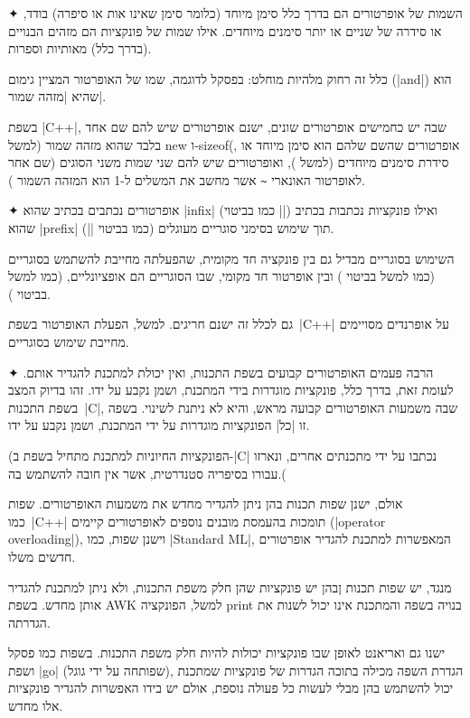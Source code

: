 \begin{enumerate}
 ✦ השמות של אופרטורים הם בדרך כלל סימן מיוחד (כלומר סימן שאינו אות או סיפרה)
 בודד, או סידרה של שניים או יותר סימנים מיוחדים. אילו שמות של פונקציות הם
 מזהים הבנויים (בדרך כלל) מאותיות וספרות.

 כלל זה רחוק מלהיות מוחלט: בפסקל לדוגמה, שמו של האופרטור המציין גימום
 (\E|and|) הוא  שהיא \ע|מזהה שמור|.

 בשפת \E|C++|, שבה יש כחמישים אופרטורים שונים, ישנם אופרטורים שיש להם שם אחד
 בלבד שהוא מזהה שמור (למשל new ו-sizeof(, אופרטורים שהשם שלהם הוא סימן
 מיוחד או סידרת סימנים מיוחדים (למשל \cc{<==>}), ואופרטורים שיש להם שני שמות
 משני הסוגים (שם אחר לאופרטור האונארי \lstinline{~} אשר מחשב את המשלים ל-1 הוא
 המזהה השמור ).

 ✦ אופרטורים נכתבים בכתיב שהוא \E|infix| (כמו בביטוי \E||) ואילו
 פונקציות נכתבות בכתיב שהוא \E|prefix| תוך שימוש בסימני סוגריים מעוגלים (כמו
 בביטוי \E||).

 השימוש בסוגריים מבדיל גם בין פונקציה חד מקומית, שהפעלתה מחייבת להשתמש
 בסוגריים (כמו למשל בביטוי ) ובין אופרטור חד מקומי, שבו הסוגריים
 הם אופציונליים, (כמו למשל בביטוי ).

גם לכלל זה ישנם חריגים. למשל, הפעלת האופרטור  בשפת~\E|C++| על
אופרנדים מסויימים מחייבת שימוש בסוגריים.

  ✦ הרבה פעמים האופרטורים קבועים בשפת התכנות, ואין יכולת למתכנת להגדיר אותם.
  לעומת זאת, בדרך כלל, פונקציות מוגדרות בידי המתכנת, ושמן נקבע על ידו. זהו
  בדיוק המצב בשפת התכנות~\E|C|, שבה משמעות האופרטורים קבועה מראש, והיא לא ניתנת
  לשינוי. בשפה זו \ע|כל| הפונקציות מוגדרות על ידי המתכנת, ושמן נקבע על ידו.

  (הפונקציות החיוניות למתכנת מתחיל בשפת ב-\E|C| נכתבו על ידי מתכנתים אחרים,
  ונארזו עבורו בסיפריה סטנדרטית, אשר אין חובה להשתמש בה.(

  אולם, ישנן שפות תכנות בהן ניתן להגדיר מחדש את משמעות האופרטורים. שפות
  כמו~\E|C++| תומכות בהעמסת מובנים נוספים לאופרטורים קיימים (\E|operator
  overloading|), וישנן שפות, כמו \E|Standard ML|, המאפשרות למתכנת להגדיר
  אופרטורים חדשים משלו.

  מנגד, יש שפות תכנות ןבהן יש פונקציות שהן חלק משפת התכנות, ולא ניתן למתכנת
  להגדיר אותן מחדש. בשפת AWK למשל, הפונקציה print בנויה בשפה והמתכנת אינו יכול
  לשנות את הגדרתה.

  ישנו גם ואריאנט לאופן שבו פונקציות יכולות להיות חלק משפת התכנות. בשפות כמו
  פסקל ושפת \E|go| (שפותחה על ידי גוגל), הגדרת השפה מכילה בתוכה הגדרות של
  פונקציות שמתכנת יכול להשתמש בהן מבלי לעשות כל פעולה נוספת, אולם יש בידו
  האפשרות להגדיר פונקציות אלו מחדש.
\end{enumerate}

